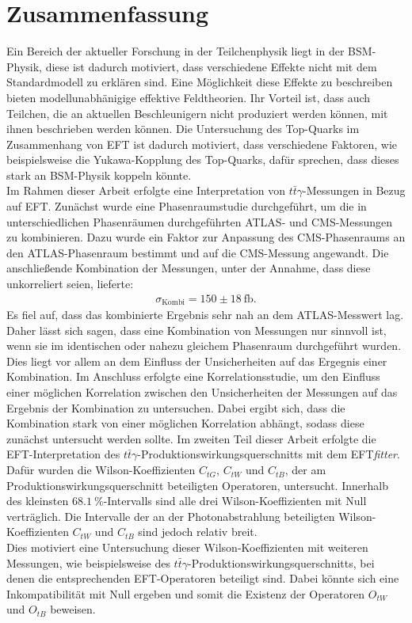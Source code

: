 \chapter{Zusammenfassung}
Ein Bereich der aktueller Forschung in der Teilchenphysik liegt in der BSM-Physik, diese ist dadurch motiviert, dass verschiedene Effekte nicht mit dem Standardmodell zu erklären sind. Eine Möglichkeit diese Effekte zu beschreiben bieten modellunabhänigige effektive Feldtheorien. Ihr Vorteil ist, dass auch Teilchen, die an aktuellen Beschleunigern nicht produziert werden können, mit ihnen beschrieben werden können. Die Untersuchung des Top-Quarks im Zusammenhang von EFT ist dadurch motiviert, dass verschiedene Faktoren, wie beispielsweise die Yukawa-Kopplung des Top-Quarks, dafür sprechen, dass dieses stark an BSM-Physik koppeln könnte. \\
Im Rahmen dieser Arbeit erfolgte eine Interpretation von $t\bar{t}\gamma$-Messungen in Bezug auf EFT. Zunächst wurde eine Phasenraumstudie durchgeführt, um die in unterschiedlichen Phasenräumen durchgeführten ATLAS- und CMS-Messungen zu kombinieren. Dazu wurde ein Faktor zur Anpassung des CMS-Phasenraums an den ATLAS-Phasenraum bestimmt und auf die CMS-Messung angewandt. Die anschließende Kombination der Messungen, unter der Annahme, dass diese unkorreliert seien, lieferte:
\begin{align*}
  \sigma_{\text{Kombi}} = 150 \pm 18~ \si{\femto\barn}.
\end{align*}
Es fiel auf, dass das kombinierte Ergebnis sehr nah an dem ATLAS-Messwert lag. Daher lässt sich sagen, dass eine Kombination von Messungen nur sinnvoll ist, wenn sie im identischen oder nahezu gleichem Phasenraum durchgeführt wurden. Dies liegt vor allem an dem Einfluss der Unsicherheiten auf das Ergegnis einer Kombination. Im Anschluss erfolgte eine Korrelationsstudie, um den Einfluss einer möglichen Korrelation zwischen den Unsicherheiten der Messungen auf das Ergebnis der Kombination zu untersuchen. Dabei ergibt sich, dass die Kombination stark von einer möglichen Korrelation abhängt, sodass diese zunächst untersucht werden sollte.
Im zweiten Teil dieser Arbeit erfolgte die EFT-Interpretation des $t\bar{t}\gamma$-Produktionswirkungsquerschnitts mit dem EFT\textit{fitter}. Dafür wurden die Wilson-Koeffizienten $C_{tG}$, $C_{tW}$ und $C_{tB}$, der am Produktionswirkungsquerschnitt beteiligten Operatoren, untersucht. Innerhalb des kleinsten $\SI{68.1}{\percent}$-Intervalls sind alle drei Wilson-Koeffizienten mit Null verträglich. Die Intervalle der an der Photonabstrahlung beteiligten Wilson-Koeffizienten $C_{tW}$ und $C_{tB}$ sind jedoch relativ breit.\\
Dies motiviert eine Untersuchung dieser Wilson-Koeffizienten mit weiteren Messungen, wie beispielsweise des $t\bar{t}\gamma$-Produktionswirkungsquerschnitts, bei denen die entsprechenden EFT-Operatoren beteiligt sind. Dabei könnte sich eine Inkompatibilität mit Null ergeben und somit die Existenz der Operatoren $O_{tW}$ und $O_{tB}$ beweisen.
